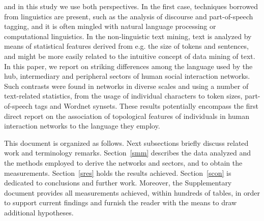\documentclass[review]{elsarticle}
\begin{document}
and in this study we use both perspectives.
In the first case, techniques borrowed from linguistics are present, such as
the analysis of discourse and part-of-speech tagging,
and it is often mingled with natural language processing or computational linguistics.
In the non-linguistic text mining, text is analyzed by means of statistical features
derived from e.g. the size of tokens and sentences,
and might be more easily related to the intuitive concept of data mining of text.
In this paper, we report on striking differences among the language used by the hub, intermediary and peripheral sectors of
human social interaction networks.
Such contrasts were found in networks in diverse scales and using a number of text-related statistics,
from the usage of individual characters to token sizes, part-of-speech tags and Wordnet synsets.
These results potentially encompass the first direct report on the association of topological features
of individuals in human interaction networks to the language they employ.

This document is organized as follows.
Next subsections briefly discuss related work and terminology remarks.
Section~\ref{smm} describes the data analyzed and the methods employed to
derive the networks and sectors, and to obtain the measurements.
Section~\ref{sres} holds the results achieved.
Section~\ref{scon} is dedicated to conclusions and further work.
Moreover, the Supplementary document provides all measurements achieved,
within hundreds of tables, in order to support current findings and furnish
the reader with the means to draw additional hypotheses.
\end{document}
